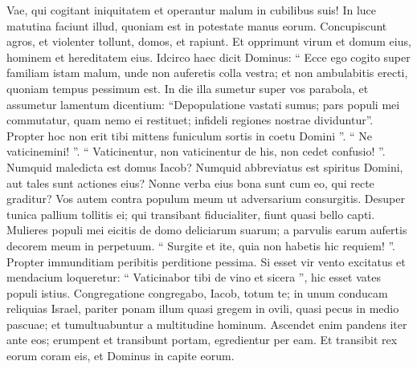 \begin{biblechapter}
\begin{biblechapter}
 \verse Vae, qui cogitant iniquitatem
 et operantur malum in cubilibus suis!
 In luce matutina faciunt illud,
 quoniam est in potestate manus eorum.
 \verse Concupiscunt agros, et violenter tollunt,
 domos, et rapiunt.
 Et opprimunt virum et domum eius,
 hominem et hereditatem eius.
 \verse Idcirco haec dicit Dominus:
 “ Ecce ego cogito
 super familiam istam malum,
 unde non auferetis
 colla vestra;
 et non ambulabitis erecti,
 quoniam tempus pessimum est.
 \verse In die illa
 sumetur super vos parabola,
 et assumetur lamentum dicentium: “Depopulatione vastati sumus;
 pars populi mei commutatur,
 quam nemo ei restituet;
 infideli regiones nostrae dividuntur”.
 \verse Propter hoc non erit tibi
 mittens funiculum sortis
 in coetu Domini ”.
 \verse “ Ne vaticinemini! ”. “ Vaticinentur,
 non vaticinentur de his,
 non cedet confusio! ”.
 \verse Numquid maledicta est domus Iacob?
 Numquid abbreviatus est spiritus Domini,
 aut tales sunt actiones eius?
 Nonne verba eius bona sunt
 cum eo, qui recte graditur?
 \verse Vos autem contra populum meum
 ut adversarium consurgitis.
 Desuper tunica pallium tollitis ei;
 qui transibant fiducialiter,
 fiunt quasi bello capti.
 \verse Mulieres populi mei eicitis
 de domo deliciarum suarum;
 a parvulis earum aufertis
 decorem meum in perpetuum.
 \verse “ Surgite et ite,
 quia non habetis hic requiem! ”.
 Propter immunditiam peribitis
 perditione pessima.
 \verse Si esset vir vento excitatus
 et mendacium loqueretur:
 “ Vaticinabor tibi de vino et sicera ”,
 hic esset vates populi istius.
 \verse Congregatione congregabo, Iacob, totum te;
 in unum conducam reliquias Israel,
 pariter ponam illum quasi gregem in ovili,
 quasi pecus in medio pascuae;
 et tumultuabuntur a multitudine hominum.
 \verse Ascendet enim pandens iter ante eos;
 erumpent et transibunt portam, egredientur per eam.
 Et transibit rex eorum coram eis,
 et Dominus in capite eorum.
 

\end{biblechapter}
\end{biblechapter}
